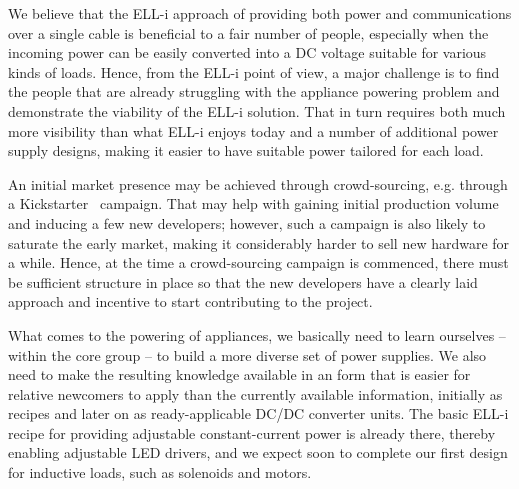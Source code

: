 \documentclass{siamltex}
\begin{document}
We believe that the ELL-i approach of providing both power and
communications over a single cable is beneficial to a fair number of
people, especially when the incoming power can be easily converted
into a DC voltage suitable for various kinds of loads.  Hence, from
the ELL-i point of view, a major challenge is to find the people that
are already struggling with the appliance powering problem and
demonstrate the viability of the ELL-i solution.  That in turn
requires both much more visibility than what ELL-i enjoys today and a
number of additional power supply designs, making it easier to have
suitable power tailored for each load.

An initial market presence may be achieved through crowd-sourcing,
e.g. through a Kickstarter~\cite{Kickstarter} campaign.  That may help
with gaining initial production volume and inducing a few new
developers; however, such a campaign is also likely to saturate the
early market, making it considerably harder to sell new hardware for a
while.  Hence, at the time a crowd-sourcing campaign is commenced,
there must be sufficient structure in place so that the new developers
have a clearly laid approach and incentive to start contributing to
the project.

What comes to the powering of appliances, we basically need to learn
ourselves -- within the core group -- to build a more diverse set of
power supplies.  We also need to make the resulting knowledge
available in an form that is easier for relative newcomers to apply
than the currently available information, initially as recipes and
later on as ready-applicable DC/DC converter units.  The basic ELL-i
recipe for providing adjustable constant-current power is already
there, thereby enabling adjustable LED drivers, and we expect soon to
complete our first design for inductive loads, such as solenoids and
motors.
\end{document}
